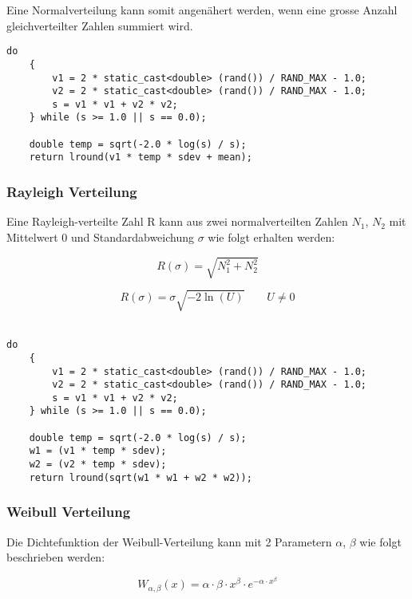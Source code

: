 Eine Normalverteilung kann somit angenähert werden, wenn eine grosse Anzahl gleichverteilter Zahlen summiert wird.

\begin{lstlisting}[style=C]
	do
	{
		v1 = 2 * static_cast<double> (rand()) / RAND_MAX - 1.0;
		v2 = 2 * static_cast<double> (rand()) / RAND_MAX - 1.0;
		s = v1 * v1 + v2 * v2;
	} while (s >= 1.0 || s == 0.0);
	
	double temp = sqrt(-2.0 * log(s) / s);
	return lround(v1 * temp * sdev + mean);
\end{lstlisting} 

\subsubsection{Rayleigh Verteilung}
Eine Rayleigh-verteilte Zahl R kann aus zwei normalverteilten Zahlen $N_1$, $N_2$ mit Mittelwert 0 und Standardabweichung $\sigma$ wie folgt erhalten werden:

\begin{equation}
	R(\sigma) = \sqrt{N_1^2 + N_2^2}
\end{equation}

 \begin{equation}
 	R(\sigma) = \sigma \sqrt{-2 \ln(U)} \qquad U \neq 0
 \end{equation}\\

\begin{lstlisting}[style=C]
	do
	{
		v1 = 2 * static_cast<double> (rand()) / RAND_MAX - 1.0;
		v2 = 2 * static_cast<double> (rand()) / RAND_MAX - 1.0;
		s = v1 * v1 + v2 * v2;
	} while (s >= 1.0 || s == 0.0);
	
	double temp = sqrt(-2.0 * log(s) / s);
	w1 = (v1 * temp * sdev);
	w2 = (v2 * temp * sdev);
	return lround(sqrt(w1 * w1 + w2 * w2));

\end{lstlisting} 

\subsubsection{Weibull Verteilung}
Die Dichtefunktion der Weibull-Verteilung kann mit 2 Parametern $\alpha$, $\beta$ wie folgt beschrieben werden:

\begin{equation}
	W_{\alpha,\beta}(x) = \alpha \cdot \beta \cdot x^\beta \cdot e^{-\alpha \cdot x^\beta} 
\end{equation}

